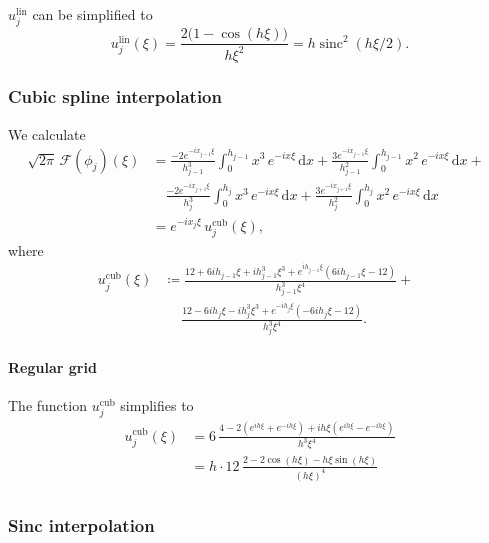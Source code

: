 \documentclass[a4paper]{paper}
\newcommand*{\OP}[1]{{\ensuremath{\mathcal{#1}}}}
\newcommand*{\FT}{\OP{F}}
\DeclareMathOperator{\SINC}{{sinc}}
\DeclareMathOperator{\DEFEQ}{{\coloneqq}}
\newcommand*{\I}{\ensuremath{\mathit{i}}}
\newcommand*{\D}{{\ensuremath{\mathrm{d}}}}
\begin{document}
$u_j^{\mathrm{lin}}$ can be simplified to
%
\begin{equation*}
 u_j^{\mathrm{lin}}(\xi) = \frac{2\big( 1-\cos(h\xi) \big)}{h\xi^2} = h \SINC^2(h\xi/2).
\end{equation*}



\subsubsection{Cubic spline interpolation}
\label{subsubsec:specif:fourier:cubic}

We calculate
%
\begin{align*}
 \sqrt{2\pi}\, \FT(\phi_j)(\xi)
 &= \frac{-2 e^{-\I x_{j-1} \xi}}{h_{j-1}^3} \int_0^{h_{j-1}} x^3\, e^{-\I x\xi}\, \D x +
 \frac{3 e^{-\I x_{j-1} \xi}}{h_{j-1}^2} \int_0^{h_{j-1}} x^2\, e^{-\I x\xi}\, \D x + \phantom{x} \\
 &\hspace{12pt} \frac{-2 e^{-\I x_{j+1} \xi}}{h_j^3} \int_0^{h_j} x^3\, e^{-\I x\xi}\, \D x +
 \frac{3 e^{-\I x_{j+1} \xi}}{h_j^2} \int_0^{h_j} x^2\, e^{-\I x\xi}\, \D x \\
 &= e^{-\I x_j \xi}\, u_j^{\mathrm{cub}}(\xi),
\end{align*}
%
where
%
\begin{align*}
 u_j^{\mathrm{cub}}(\xi) &\DEFEQ 
 \frac{12 + 6\I h_{j-1}\xi + \I h_{j-1}^3\xi^3 + e^{\I h_{j-1}\xi} (6\I h_{j-1}\xi - 12)}{h_{j-1}^3 \xi^4} + 
 \phantom{x}\\
 &\hspace{15pt} 
 \frac{12 - 6\I h_j\xi - \I h_j^3\xi^3 + e^{-\I h_j\xi} (- 6\I h_j\xi - 12)}{h_j^3 \xi^4}.
\end{align*}

\paragraph{Regular grid} 

The function $u_j^{\mathrm{cub}}$ simplifies to
%
\begin{align*}
 u_j^{\mathrm{cub}}(\xi) 
 &= 6\, \frac{4 - 2(e^{\I h \xi} + e^{-\I h \xi}) + \I h \xi(e^{\I h \xi} - e^{-\I h \xi})}{h^3\xi^4} \\
 &= h\cdot 12\, \frac{2 - 2\cos(h\xi) - h \xi \sin(h\xi)}{(h\xi)^4} \\
\end{align*}

\subsubsection{Sinc interpolation}
\label{subsubsec:specif:fourier:sinc}
\end{document}
